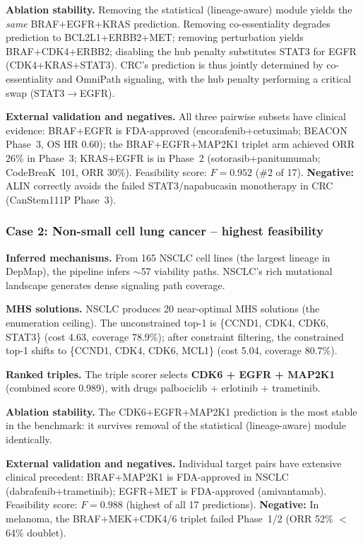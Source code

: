 \documentclass[11pt]{article}
\begin{document}
\textbf{Ablation stability.} Removing the statistical (lineage-aware) module yields the \emph{same} BRAF+EGFR+KRAS prediction. Removing co-essentiality degrades prediction to BCL2L1+ERBB2+MET; removing perturbation yields BRAF+CDK4+ERBB2; disabling the hub penalty substitutes STAT3 for EGFR (CDK4+KRAS+STAT3). CRC's prediction is thus jointly determined by co-essentiality and OmniPath signaling, with the hub penalty performing a critical swap (STAT3$\to$EGFR).

\textbf{External validation and negatives.} All three pairwise subsets have clinical evidence: BRAF+EGFR is FDA-approved (encorafenib+cetuximab; BEACON Phase~3, OS HR 0.60); the BRAF+EGFR+MAP2K1 triplet arm achieved ORR 26\% in Phase~3; KRAS+EGFR is in Phase~2 (sotorasib+panitumumab; CodeBreaK~101, ORR 30\%). Feasibility score: $F = 0.952$ (\#2 of 17). \textbf{Negative:} ALIN correctly avoids the failed STAT3/napabucasin monotherapy in CRC (CanStem111P Phase~3).

\subsubsection{Case 2: Non-small cell lung cancer -- highest feasibility}

\textbf{Inferred mechanisms.} From 165 NSCLC cell lines (the largest lineage in DepMap), the pipeline infers $\sim$57 viability paths. NSCLC's rich mutational landscape generates dense signaling path coverage.

\textbf{MHS solutions.} NSCLC produces 20 near-optimal MHS solutions (the enumeration ceiling). The unconstrained top-1 is \{CCND1, CDK4, CDK6, STAT3\} (cost 4.63, coverage 78.9\%); after constraint filtering, the constrained top-1 shifts to \{CCND1, CDK4, CDK6, MCL1\} (cost 5.04, coverage 80.7\%).

\textbf{Ranked triples.} The triple scorer selects \textbf{CDK6 + EGFR + MAP2K1} (combined score 0.989), with drugs palbociclib + erlotinib + trametinib.

\textbf{Ablation stability.} The CDK6+EGFR+MAP2K1 prediction is the most stable in the benchmark: it survives removal of the statistical (lineage-aware) module identically.

\textbf{External validation and negatives.} Individual target pairs have extensive clinical precedent: BRAF+MAP2K1 is FDA-approved in NSCLC (dabrafenib+trametinib); EGFR+MET is FDA-approved (amivantamab). Feasibility score: $F = 0.988$ (highest of all 17 predictions). \textbf{Negative:} In melanoma, the BRAF+MEK+CDK4/6 triplet failed Phase~1/2 (ORR 52\% $<$ 64\% doublet).
\end{document}
